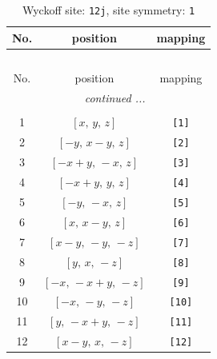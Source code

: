 \documentclass[fleqn,8pt]{jsarticle}
\begin{document}
\begin{longtable}{ccc}
\caption{Wyckoff site: {\tt 12j}, site symmetry: {\tt 1}}
 \\
 \hline \hline
No. & position & mapping \\ \hline \endfirsthead

\multicolumn{2}{l}{\tablename\ \thetable{}} \\
 \hline \hline
No. & position & mapping \\ \hline \endhead

 \hline \hline
\multicolumn{2}{r}{\footnotesize\it continued ...} \\ \endfoot

 \hline \hline
\multicolumn{2}{r}{} \\ \endlastfoot

1 & $\left[ x,\, y,\, z \right]$ & {\tt [1]} \\ \hline
2 & $\left[ - y,\, x - y,\, z \right]$ & {\tt [2]} \\ \hline
3 & $\left[ - x + y,\, - x,\, z \right]$ & {\tt [3]} \\ \hline
4 & $\left[ - x + y,\, y,\, z \right]$ & {\tt [4]} \\ \hline
5 & $\left[ - y,\, - x,\, z \right]$ & {\tt [5]} \\ \hline
6 & $\left[ x,\, x - y,\, z \right]$ & {\tt [6]} \\ \hline
7 & $\left[ x - y,\, - y,\, - z \right]$ & {\tt [7]} \\ \hline
8 & $\left[ y,\, x,\, - z \right]$ & {\tt [8]} \\ \hline
9 & $\left[ - x,\, - x + y,\, - z \right]$ & {\tt [9]} \\ \hline
10 & $\left[ - x,\, - y,\, - z \right]$ & {\tt [10]} \\ \hline
11 & $\left[ y,\, - x + y,\, - z \right]$ & {\tt [11]} \\ \hline
12 & $\left[ x - y,\, x,\, - z \right]$ & {\tt [12]} \\
\end{longtable}
\end{document}

